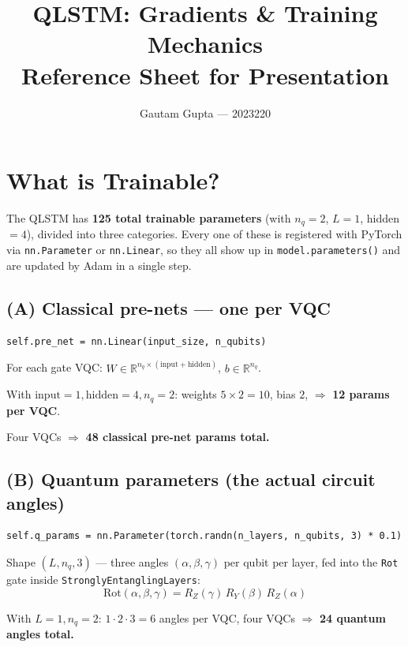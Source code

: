 \documentclass[11pt,a4paper]{article}
\title{\color{accentblue}\bfseries QLSTM: Gradients \& Training Mechanics\\[2pt]
\large Reference Sheet for Presentation}
\author{Gautam Gupta --- 2023220}
\date{}
\begin{document}
\maketitle

\section{What is Trainable?}

The QLSTM has \textbf{125 total trainable parameters} (with $n_q=2$, $L=1$, hidden$=4$),
divided into three categories. Every one of these is registered with PyTorch via
\texttt{nn.Parameter} or \texttt{nn.Linear}, so they all show up in
\texttt{model.parameters()} and are updated by Adam in a single step.

\subsection{(A) Classical pre-nets --- one per VQC}

\begin{lstlisting}
self.pre_net = nn.Linear(input_size, n_qubits)
\end{lstlisting}

For each gate VQC: $W \in \mathbb{R}^{n_q \times (\text{input}+\text{hidden})}$, $b \in \mathbb{R}^{n_q}$.

With $\text{input}=1, \text{hidden}=4, n_q=2$: weights $5{\times}2 = 10$, bias $2$, $\Rightarrow$ \textbf{12 params per VQC}.

Four VQCs $\Rightarrow$ \textbf{48 classical pre-net params total.}

\subsection{(B) Quantum parameters (the actual circuit angles)}

\begin{lstlisting}
self.q_params = nn.Parameter(torch.randn(n_layers, n_qubits, 3) * 0.1)
\end{lstlisting}

Shape $(L, n_q, 3)$ --- three angles $(\alpha, \beta, \gamma)$ per qubit per layer,
fed into the \texttt{Rot} gate inside \texttt{StronglyEntanglingLayers}:
\[
  \mathrm{Rot}(\alpha, \beta, \gamma) = R_Z(\gamma) \, R_Y(\beta) \, R_Z(\alpha)
\]

With $L=1, n_q=2$: $1 \cdot 2 \cdot 3 = 6$ angles per VQC, four VQCs $\Rightarrow$
\textbf{24 quantum angles total.}
\end{document}
